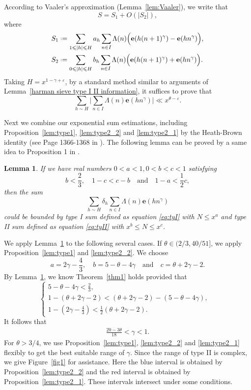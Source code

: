 \documentclass[12pt, reqno, twoside, letterpaper]{amsart}
\numberwithin{equation}{section}
\newcommand{\e}{\ensuremath{\mathbf{e}}}
\theoremstyle{customthm}
\newtheorem{lemma}[X]{Lemma}
\theoremstyle{customrem}
\newcommand*{\defeq}{\mathrel{\vcenter{\baselineskip0.5ex \lineskiplimit0pt
			\hbox{\scriptsize.}\hbox{\scriptsize.}}}%
	=}
\begin{document}
According to Vaaler's approximation (Lemma~\ref{lem:Vaaler}), we write that
$$
S = S_1 + O(|S_2|),
$$
where
\begin{align*}
&S_1 \defeq \sum_{1 \leqslant |h| \leqslant H} a_h \sum_{n \in I} \Lambda(n) \Big( \e(h(n+1)^\gamma) - \e(hn^\gamma) \Big), \\
&S_2 \defeq \sum_{0 \leqslant |h| \leqslant H} b_h \sum_{n \in I} \Lambda(n) \Big( \e(h(n+1)^\gamma) + \e(hn^\gamma) \Big).
\end{align*}
Taking $H = x^{1-\gamma+
	\varepsilon}$, by a standard method similar to arguments of Lemma~\ref{harman sieve type I II information}, it suffices to prove that 
$$
\sum_{h \sim H} \Big| \sum_{n\in I} \Lambda(n) \e(hn^\gamma) \Big| \ll x^{\theta-\varepsilon}.
$$ 

Next we combine our exponential sum estimations, including Proposition~\ref{lem:type1}, \ref{lem:type2_2} and \ref{lem:type2_1} by the Heath-Brown identity (see Page 1366-1368 in \cite{HB}). The following lemma can be proved by a same idea to Proposition 1 in \cite{BF}. 
\begin{lemma}\label{lem:HB indentity}
If we have real numbers $0<a<1, 0<b<c<1$ satisfying
$$
b<\frac{2}{3}, \quad 1-c<c-b \quad \text{and}\quad 1-a<\frac{1}{2}c,
$$
then the sum
$$
\sum_{h \sim H} \delta_h \sum_{n\in I} \Lambda(n) \e(hn^\gamma) 
$$
could be bounded by type I sum defined as equation \eqref{eq:tyI} with $N \leqslant x^a$ and type II sum defined as equation \eqref{eq:tyII} with $x^b \leqslant N \leqslant x^c$.
\end{lemma}
We apply Lemma~\ref{lem:HB indentity} to the following several cases. If $\theta \in (2/3,40/51]$, we apply Proposition~\ref{lem:type1} and \ref{lem:type2_2}. We choose
$$
a = 2\gamma-\frac{4}{3}, \quad b=5-\theta-4\gamma \quad \text{and}\quad c=\theta +2\gamma-2. 
$$
By Lemma~\ref{lem:HB indentity}, we know Theorem~\ref{thm1} holds provided that
$$
\left\{\begin{array}{ll}
	5-\theta-4\gamma < \frac{2}{3}, & \\
	1 - (\theta +2\gamma-2) < (\theta +2\gamma-2) - (5-\theta-4\gamma), & \\
	1 - (2\gamma-\frac{4}{3}) < \frac{1}{2} (\theta +2\gamma-2). &
\end{array}\right.
$$
It follows that
\begin{align}\label{condition1}
\frac{20-3\theta}{18} < \gamma < 1.
\end{align}
For $\theta > 3/4$, we use Proposition~\ref{lem:type1}, \ref{lem:type2_2} and \ref{lem:type2_1} flexibly to get the best suitable range of $\gamma$. Since the range of type II is complex, we give Figure~\ref{fig1} for assistance. Here the blue interval is obtained by Proposition~\ref{lem:type2_2} and the red interval is obtained by Proposition~\ref{lem:type2_1}. These intervals intersect under some conditions.
\end{document}
